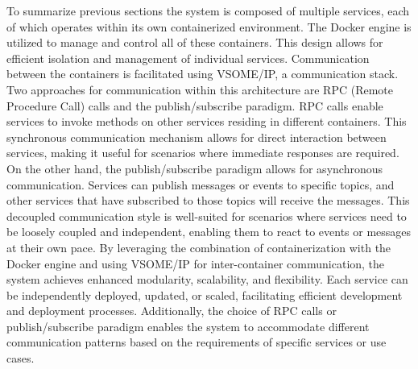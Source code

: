\documentclass[
12pt,
oneside, 
onehalfspacing, 
nolistspacing, 
parskip, 
chapterinoneline, 
]{AASTCOMPUTER}
\begin{document}
To summarize previous sections the system is composed of multiple services, each of which operates within its own containerized environment. The Docker engine is utilized to manage and control all of these containers. This design allows for efficient isolation and management of individual services. Communication between the containers is facilitated using VSOME/IP, a communication stack. Two approaches for communication within this architecture are RPC (Remote Procedure Call) calls and the publish/subscribe paradigm. RPC calls enable services to invoke methods on other services residing in different containers. This synchronous communication mechanism allows for direct interaction between services, making it useful for scenarios where immediate responses are required. On the other hand, the publish/subscribe paradigm allows for asynchronous communication. Services can publish messages or events to specific topics, and other services that have subscribed to those topics will receive the messages. This decoupled communication style is well-suited for scenarios where services need to be loosely coupled and independent, enabling them to react to events or messages at their own pace. By leveraging the combination of containerization with the Docker engine and using VSOME/IP for inter-container communication, the system achieves enhanced modularity, scalability, and flexibility.
Each service can be independently deployed, updated, or scaled, facilitating efficient development and deployment processes. Additionally, the choice of RPC calls or publish/subscribe paradigm enables the system to accommodate different communication patterns based on the requirements of specific services or use cases.
\end{document}
